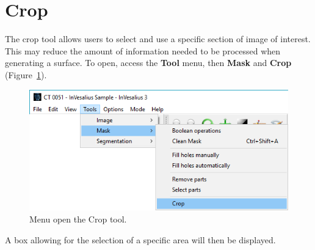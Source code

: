 \section{Crop}

The crop tool allows users to select and use a specific section of image of interest. This may reduce the amount of information needed to be processed when generating a surface. To open, access the \textbf{Tool} menu, then \textbf{Mask} and \textbf{Crop} (Figure~\ref{fig:menu_mask_crop}).

\begin{figure}[!htb]
\centering
\includegraphics[scale=0.4]{../user_guide_figures/invesalius_screen/menu_mask_crop_en.png}
\caption{Menu open the Crop tool.}
\label{fig:menu_mask_crop}
\end{figure}

A box allowing for the selection of a specific area will then be displayed.